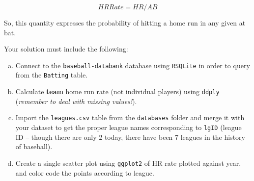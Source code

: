 \documentclass[]{article}
\begin{document}
\[HRRate = HR/AB\]

So, this quantity expresses the probability of hitting a home run in any
given at bat.

Your solution must include the following:

\begin{enumerate}[a.]
\item
  Connect to the \texttt{baseball-databank} database using
  \texttt{RSQLite} in order to query from the \texttt{Batting} table.
\item
  Calculate \textbf{team} home run rate (not individual players) using
  \texttt{ddply} (\emph{remember to deal with missing values!}).
\item
  Import the \texttt{leagues.csv} table from the \texttt{databases}
  folder and merge it with your dataset to get the proper league names
  corresponding to \texttt{lgID} (league ID -- though there are only 2
  today, there have been 7 leagues in the history of baseball).
\item
  Create a single scatter plot using \texttt{ggplot2} of HR rate plotted
  against year, and color code the points according to league.
\end{enumerate}
\end{document}
